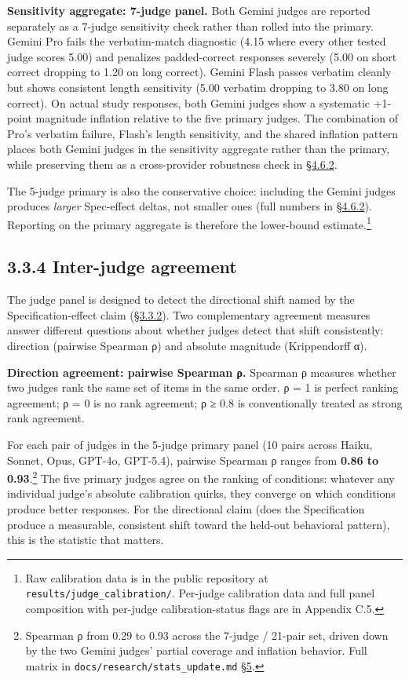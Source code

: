 \textbf{Sensitivity aggregate: 7-judge panel.} Both Gemini judges are
reported separately as a 7-judge sensitivity check rather than rolled
into the primary. Gemini Pro fails the verbatim-match diagnostic (4.15
where every other tested judge scores 5.00) and penalizes padded-correct
responses severely (5.00 on short correct dropping to 1.20 on long
correct). Gemini Flash passes verbatim cleanly but shows consistent
length sensitivity (5.00 verbatim dropping to 3.80 on long correct). On
actual study responses, both Gemini judges show a systematic +1-point
magnitude inflation relative to the five primary judges. The combination
of Pro's verbatim failure, Flash's length sensitivity, and the shared
inflation pattern places both Gemini judges in the sensitivity aggregate
rather than the primary, while preserving them as a cross-provider
robustness check in \hyperref[judge-panel-sensitivity-5-judge-primary-vs-7-judge]{§4.6.2}.

The 5-judge primary is also the conservative choice: including the
Gemini judges produces \emph{larger} Spec-effect deltas, not smaller
ones (full numbers in \hyperref[judge-panel-sensitivity-5-judge-primary-vs-7-judge]{§4.6.2}). Reporting on the primary aggregate is
therefore the lower-bound estimate.\footnote{Raw calibration data is in
  the public repository at \texttt{results/judge\_calibration/}.
  Per-judge calibration data and full panel composition with per-judge
  calibration-status flags are in Appendix C.5.}

\hypertarget{inter-judge-agreement}{%
\subsection{3.3.4 Inter-judge agreement}\label{inter-judge-agreement}}

The judge panel is designed to detect the directional shift named by the
Specification-effect claim (\hyperref[judge-panel]{§3.3.2}). Two complementary agreement
measures answer different questions about whether judges detect that
shift consistently: direction (pairwise Spearman ρ) and absolute
magnitude (Krippendorff α).

\textbf{Direction agreement: pairwise Spearman ρ.} Spearman ρ measures
whether two judges rank the same set of items in the same order. ρ = 1
is perfect ranking agreement; ρ = 0 is no rank agreement; ρ ≥ 0.8 is
conventionally treated as strong rank agreement.

For each pair of judges in the 5-judge primary panel (10 pairs across
Haiku, Sonnet, Opus, GPT-4o, GPT-5.4), pairwise Spearman ρ ranges from
\textbf{0.86 to 0.93}.\footnote{Spearman ρ from 0.29 to 0.93 across the
  7-judge / 21-pair set, driven down by the two Gemini judges' partial
  coverage and inflation behavior. Full matrix in
  \texttt{docs/research/stats\_update.md} \hyperref[discussion]{§5}.} The five primary judges
agree on the ranking of conditions: whatever any individual judge's
absolute calibration quirks, they converge on which conditions produce
better responses. For the directional claim (does the Specification
produce a measurable, consistent shift toward the held-out behavioral
pattern), this is the statistic that matters.

